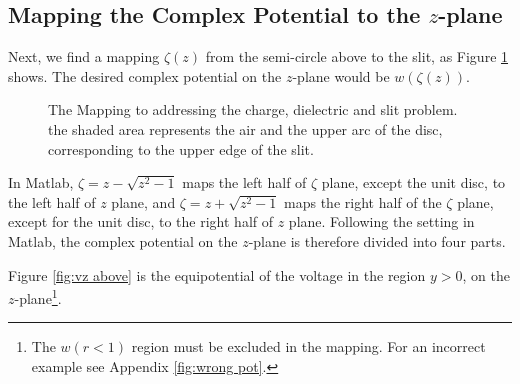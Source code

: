 \subsection{Mapping the Complex Potential to the $z$-plane}\label{cpt:slit_pot}
Next, we find a mapping $\zeta(z)$ from the semi-circle above to the slit, as Figure \ref{fig:map above} shows. The desired complex potential on the $z$-plane would be $w(\zeta(z))$.\vspace{-0.5em}
\begin{figure}[H]
    \centering
{}
    \caption{\small The Mapping to addressing the charge, dielectric and slit problem. the shaded area represents the air and the upper arc of the disc, corresponding to the upper edge of the slit.}
    \label{fig:map above}
\end{figure}
\vspace{-0.5em}
In Matlab, $\zeta=z-\sqrt{z^2-1}
$ maps the left half of $\zeta$ plane, except the unit disc, to the left half of $z$ plane, and $\zeta=z+\sqrt{z^2-1}$ maps the right half of the $\zeta$ plane, except for the unit disc, to the right half of $z$ plane. Following the setting in Matlab, the complex potential on the $z$-plane is therefore divided into four parts.

Figure \ref{fig:vz above} is the equipotential of the voltage in the region $y>0$, on the $z$-plane\footnote{The $w(r<1)$ region must be excluded in the mapping. For an incorrect example see Appendix \ref{fig:wrong pot}.}. 

